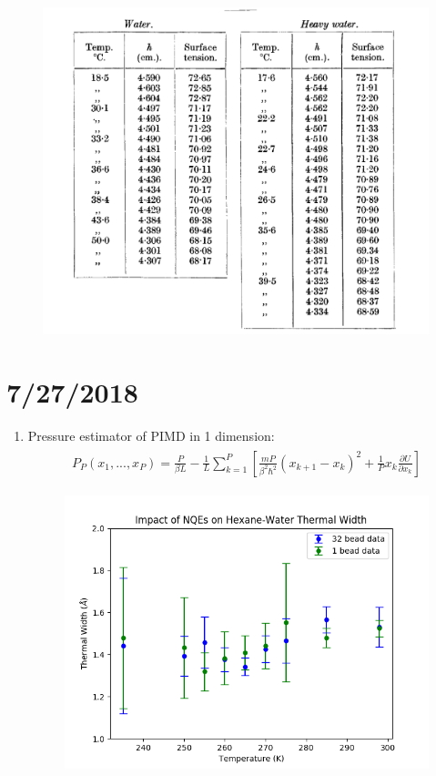 \documentclass[12pt,reqno]{amsart}
\numberwithin{equation}{section}
\begin{document}
\begin{enumerate}
\begin{figure}[H]
\centering
\includegraphics[scale=0.6]{surfacetension_heavylight}
\end{figure}

\end{enumerate}

\section{7/27/2018}
\begin{enumerate}
\item Pressure estimator of PIMD in 1 dimension:
\begin{align}
\begin{split}
P_P(x_1,...,x_P) = \frac{P}{\beta L} - \frac{1}{L}\sum_{k = 1}^P\left[\frac{mP}{\beta^2\hbar^2}(x_{k+1} - x_k)^2 + \frac{1}{P}x_k\frac{\partial U}{\partial x_k} \right]
\end{split}
\end{align}

\begin{figure}[H]
\centering
\includegraphics[scale=0.6]{thermal-width-32bead-vs-1bead-7-27-2018}
\end{figure}

\end{enumerate}
\end{document}
